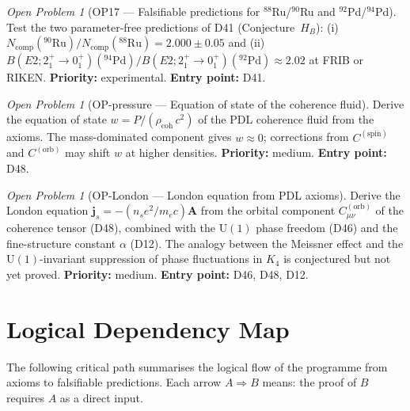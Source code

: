 \documentclass[11pt,a4paper]{article}
\theoremstyle{plain}
\theoremstyle{definition}
\theoremstyle{remark}
\newtheorem{openproblem}[theorem]{Open Problem}
\newcommand{\rhocoh}{\rho_{\mathrm{coh}}}
\begin{document}
\begin{openproblem}[OP17 --- Falsifiable predictions for $^{88}$Ru/$^{90}$Ru and $^{92}$Pd/$^{94}$Pd]
\label{op:FRIB}
Test the two parameter-free predictions of D41 (Conjecture~$H_B$): (i) $N_{\mathrm{comp}}(^{90}\mathrm{Ru})/N_{\mathrm{comp}}(^{88}\mathrm{Ru})=2.000\pm0.05$ and (ii) $B(E2;2^+_1\!\to\!0^+_1)(^{94}\mathrm{Pd})/B(E2;2^+_1\!\to\!0^+_1)(^{92}\mathrm{Pd})\approx 2.02$ at FRIB or RIKEN. \textbf{Priority:} experimental. \textbf{Entry point:} D41.
\end{openproblem}

\begin{openproblem}[OP-pressure --- Equation of state of the coherence fluid]
\label{op:pressure}
Derive the equation of state $w = P/(\rhocoh\,c^2)$ of the PDL coherence fluid from the axioms. The mass-dominated component gives $w \approx 0$; corrections from $C^{(\mathrm{spin})}$ and $C^{(\mathrm{orb})}$ may shift $w$ at higher densities. \textbf{Priority:} medium. \textbf{Entry point:} D48.
\end{openproblem}

\begin{openproblem}[OP-London --- London equation from PDL axioms]
\label{op:London}
Derive the London equation $\mathbf{j}_s = -(n_s e^2/m_e c)\mathbf{A}$ from the orbital component $C^{(\mathrm{orb})}_{\mu\nu}$ of the coherence tensor (D48), combined with the $\mathrm{U}(1)$ phase freedom (D46) and the fine-structure constant $\alpha$ (D12). The analogy between the Meissner effect and the $\mathrm{U}(1)$-invariant suppression of phase fluctuations in $K_4$ is conjectured but not yet proved. \textbf{Priority:} medium. \textbf{Entry point:} D46, D48, D12.
\end{openproblem}

\newpage
\section{Logical Dependency Map}
\label{sec:dependency}

The following critical path summarises the logical flow of the programme from axioms to falsifiable predictions. Each arrow $A\Rightarrow B$ means: the proof of $B$ requires $A$ as a direct input.
\end{document}
